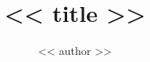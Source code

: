 \documentclass[a4paper]{amsart}
\title{<< title >>}
\author{<< author >>}
\begin{document}
\maketitle

\begin{center}
\end{center}
\end{document}
